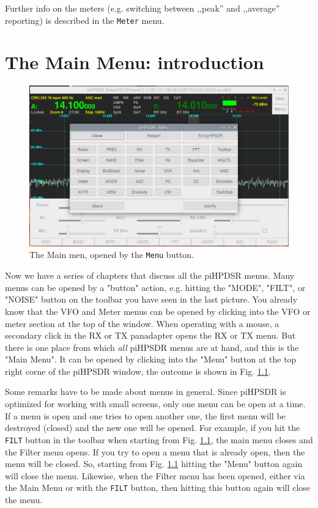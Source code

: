 \documentclass[12pt]{book}
\begin{document}
Further info on the meters (e.g. switching between ,,peak'' and ,,average'' reporting)
is described in the \texttt{Meter} menu.

\chapter{The Main Menu: introduction}

\begin{figure}[h]
\center
\includegraphics[width=12cm]{MainMenu.png}
\caption{The Main men, opened by the \texttt{Menu} button.}
\label{fig:MainMenu}
\end{figure}

Now we have a series of chapters that discuss all the piHPDSR menus. Many menus can be
opened by a "button" action, e.g. hitting the "MODE", "FILT", or "NOISE" button on the
toolbar you have seen in the last picture. You already know that the VFO and Meter
menus can be opened by clicking into the VFO or meter section at the top of the window.
When operating with a mouse, a secondary click in the RX or TX panadapter opens the
RX or TX menu. But there is one place from which \textit{all} piHPSDR menus are at hand,
and this is the "Main Menu". It can be opened by clicking into the "Menu" button at the
top right corne of the piHPSDR window, the outcome is shown in Fig. \ref{fig:MainMenu}.

Some remarks have to be made about menus in general. Since piHPSDR is optimized for
working with small screens, only one menu can be open at a time. If a menu is open
and one tries to open another one, the first menu will be destroyed (closed) and the
new one will be opened. For example, if you hit the \texttt{FILT} button in the toolbar
when starting from Fig. \ref{fig:MainMenu}, the main menu closes and the Filter menu
opens. If you try to open a menu that is already open, then the menu will be closed.
So, starting from Fig. \ref{fig:MainMenu} hitting the "Menu" button again will close
the menu. Likewise, when the Filter menu has been opened, either via the Main Menu
or with the \texttt{FILT} button, then hitting this button again will close the menu.
\end{document}
